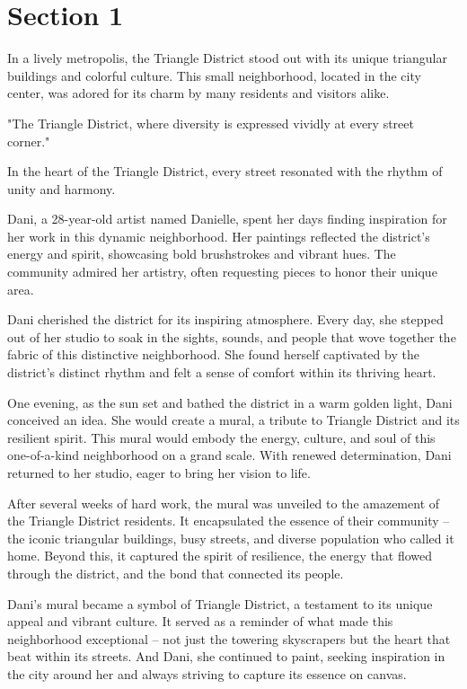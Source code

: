 \documentclass{article}
\begin{document}
\section{Section 1}

In a lively metropolis, the Triangle District stood out with its unique triangular buildings and colorful culture. This small neighborhood, located in the city center, was adored for its charm by many residents and visitors alike.

"The Triangle District, where diversity is expressed vividly at every street corner."

In the heart of the Triangle District, every street resonated with the rhythm of unity and harmony.

Dani, a 28-year-old artist named Danielle, spent her days finding inspiration for her work in this dynamic neighborhood. Her paintings reflected the district's energy and spirit, showcasing bold brushstrokes and vibrant hues. The community admired her artistry, often requesting pieces to honor their unique area.

Dani cherished the district for its inspiring atmosphere. Every day, she stepped out of her studio to soak in the sights, sounds, and people that wove together the fabric of this distinctive neighborhood. She found herself captivated by the district's distinct rhythm and felt a sense of comfort within its thriving heart.

One evening, as the sun set and bathed the district in a warm golden light, Dani conceived an idea. She would create a mural, a tribute to Triangle District and its resilient spirit. This mural would embody the energy, culture, and soul of this one-of-a-kind neighborhood on a grand scale. With renewed determination, Dani returned to her studio, eager to bring her vision to life.

After several weeks of hard work, the mural was unveiled to the amazement of the Triangle District residents. It encapsulated the essence of their community – the iconic triangular buildings, busy streets, and diverse population who called it home. Beyond this, it captured the spirit of resilience, the energy that flowed through the district, and the bond that connected its people.

Dani's mural became a symbol of Triangle District, a testament to its unique appeal and vibrant culture. It served as a reminder of what made this neighborhood exceptional – not just the towering skyscrapers but the heart that beat within its streets. And Dani, she continued to paint, seeking inspiration in the city around her and always striving to capture its essence on canvas.
\end{document}
